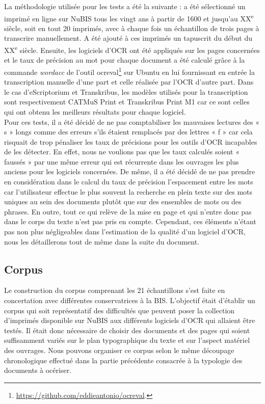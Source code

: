 \documentclass[a4paper,12pt,twoside]{book}
\begin{document}
	La méthodologie utilisée pour les tests a été la suivante : a été
	sélectionné un imprimé en ligne sur NuBIS tous les vingt ans à partir de
	1600 et jusqu'au XX\textsuperscript{e} siècle, soit en tout 20 imprimés,
	avec à chaque fois un échantillon de trois pages à transcrire
	manuellement. A été ajouté à ces imprimés un tapuscrit du début du XX\textsuperscript{e} siècle. Ensuite, les logiciels d'OCR ont été appliqués sur les
	pages concernées et le taux de précision au mot pour chaque document a
	été calculé grâce à la commande \emph{wordacc} de l'outil
	ocreval\footnote{\url{https://github.com/eddieantonio/ocreval}.}
	sur Ubuntu en lui fournissant en entrée la transcription manuelle d'une
	part et celle réalisée par l'OCR d'autre part. Dans le cas
	d'eScriptorium et Transkribus, les modèles utilisés pour la
	transcription sont respectivement CATMuS Print et Transkribus Print M1
	car ce sont celles qui ont obtenu les meilleurs résultats pour chaque
	logiciel. \\
	
	
	Pour ces tests, il a été décidé de ne pas comptabiliser les mauvaises
	lectures des « s » longs comme des erreurs s'ils étaient remplacés par
	des lettres « f » car cela risquait de trop pénaliser les taux de
	précisions pour les outils d'OCR incapables de les détecter. En effet, nous ne voulions pas que les taux calculés soient « faussés » par une même erreur qui est récurrente dans les ouvrages les plus anciens pour les logiciels concernées. De même, il
	a été décidé de ne pas prendre en considération dans le calcul du taux
	de précision l'espacement entre les mots car l'utilisateur effectue le
	plus souvent la recherche en plein texte sur des mots uniques au sein
	des documents plutôt que sur des ensembles de mots ou des phrases. En
	outre, tout ce qui relève de la mise en page et qui n'entre donc pas
	dans le corps du texte n'est pas pris en compte. Cependant, ces éléments
	n'étant pas non plus négligeables dans l'estimation de la qualité d'un
	logiciel d'OCR, nous les détaillerons tout de même dans la suite du
	document. 
	
	\subsection{Corpus}
	
	Le construction du corpus comprenant les 21 échantillons s'est faite en concertation avec différentes conservatrices à la BIS. L'objectif était d'établir un corpus qui soit représentatif des difficultés que peuvent poser la collection d'imprimés disponible sur NuBIS aux différents logiciels d'OCR qui allaient être testés. Il était donc nécessaire de choisir des documents et des pages qui soient suffisamment variés sur le plan typographique du texte et sur l'aspect matériel des ouvrages. Nous pouvons organiser ce corpus selon le même découpage chronologique effectué dans la partie précédente consacrée à la typologie des documents à océriser. \\
	
\end{document}
